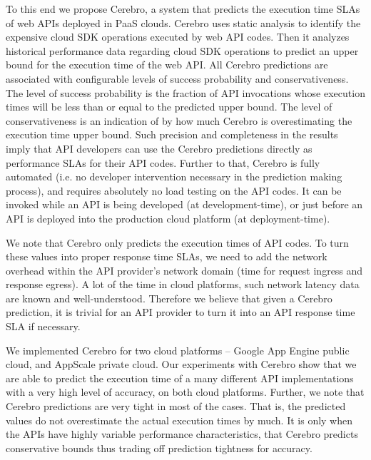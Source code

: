 To this end we propose Cerebro, a system that predicts the execution time SLAs of web APIs
deployed in PaaS clouds. Cerebro uses static analysis to identify the expensive cloud SDK operations
executed by web API codes. Then it analyzes historical performance data regarding cloud SDK
operations to predict an upper bound for the execution time of the web API. All Cerebro predictions
are associated with configurable levels of success probability and conservativeness. The level of 
success probability is the fraction of API invocations whose execution times will be less than or equal to the
predicted upper bound. The level of conservativeness is an indication of by how much Cerebro
is overestimating the execution time upper bound. Such precision and completeness in the results
imply that API developers can use the Cerebro predictions directly as performance SLAs for their
API codes. Further to that, Cerebro is fully automated (i.e. no developer intervention necessary in
the prediction making process), and requires absolutely no load testing on the API codes. It can be
invoked while an API is being developed (at development-time), or just before an API is deployed
into the production cloud platform (at deployment-time). 

We note that Cerebro only predicts the
execution times of API codes. To turn these values into proper response time SLAs, we need to
add the network overhead within the API provider's network domain (time for request ingress
and response egress). A lot of the time in cloud platforms, such network latency data are
known and well-understood. Therefore we believe that given a Cerebro prediction, it is trivial
for an API provider to turn it into an API response time SLA if necessary.

We implemented Cerebro for two cloud platforms -- Google App Engine public cloud, and AppScale
private cloud. Our experiments with Cerebro show that we are able to predict the execution time
of a many different API implementations with a very high level of accuracy, on both cloud platforms. 
Further, we note that
Cerebro predictions are very tight in most of the cases. That is, the predicted values do not
overestimate the actual execution times by much. It is only when the APIs have highly variable 
performance characteristics, that Cerebro predicts conservative bounds 
thus trading off prediction tightness for accuracy.